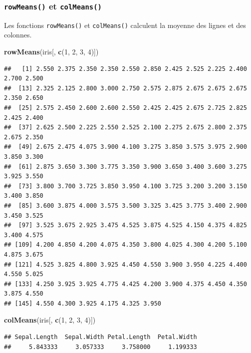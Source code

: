 \documentclass[
]{book}
\newenvironment{Shaded}{\begin{snugshade}}{\end{snugshade}}
\newcommand{\DecValTok}[1]{\textcolor[rgb]{0.00,0.00,0.81}{#1}}
\newcommand{\KeywordTok}[1]{\textcolor[rgb]{0.13,0.29,0.53}{\textbf{#1}}}
\newcommand{\NormalTok}[1]{#1}
\begin{document}
\hypertarget{l015rowmeans}{%
\subsubsection{\texorpdfstring{\texttt{rowMeans()} et \texttt{colMeans()}}{rowMeans() et colMeans()}}\label{l015rowmeans}}

Les fonctions \texttt{rowMeans()} et \texttt{colMeans()} calculent la moyenne des lignes et des colonnes.

\begin{Shaded}
\begin{Highlighting}[]
\KeywordTok{rowMeans}\NormalTok{(iris[, }\KeywordTok{c}\NormalTok{(}\DecValTok{1}\NormalTok{, }\DecValTok{2}\NormalTok{, }\DecValTok{3}\NormalTok{, }\DecValTok{4}\NormalTok{)])}
\end{Highlighting}
\end{Shaded}

\begin{verbatim}
##   [1] 2.550 2.375 2.350 2.350 2.550 2.850 2.425 2.525 2.225 2.400 2.700 2.500
##  [13] 2.325 2.125 2.800 3.000 2.750 2.575 2.875 2.675 2.675 2.675 2.350 2.650
##  [25] 2.575 2.450 2.600 2.600 2.550 2.425 2.425 2.675 2.725 2.825 2.425 2.400
##  [37] 2.625 2.500 2.225 2.550 2.525 2.100 2.275 2.675 2.800 2.375 2.675 2.350
##  [49] 2.675 2.475 4.075 3.900 4.100 3.275 3.850 3.575 3.975 2.900 3.850 3.300
##  [61] 2.875 3.650 3.300 3.775 3.350 3.900 3.650 3.400 3.600 3.275 3.925 3.550
##  [73] 3.800 3.700 3.725 3.850 3.950 4.100 3.725 3.200 3.200 3.150 3.400 3.850
##  [85] 3.600 3.875 4.000 3.575 3.500 3.325 3.425 3.775 3.400 2.900 3.450 3.525
##  [97] 3.525 3.675 2.925 3.475 4.525 3.875 4.525 4.150 4.375 4.825 3.400 4.575
## [109] 4.200 4.850 4.200 4.075 4.350 3.800 4.025 4.300 4.200 5.100 4.875 3.675
## [121] 4.525 3.825 4.800 3.925 4.450 4.550 3.900 3.950 4.225 4.400 4.550 5.025
## [133] 4.250 3.925 3.925 4.775 4.425 4.200 3.900 4.375 4.450 4.350 3.875 4.550
## [145] 4.550 4.300 3.925 4.175 4.325 3.950
\end{verbatim}

\begin{Shaded}
\begin{Highlighting}[]
\KeywordTok{colMeans}\NormalTok{(iris[, }\KeywordTok{c}\NormalTok{(}\DecValTok{1}\NormalTok{, }\DecValTok{2}\NormalTok{, }\DecValTok{3}\NormalTok{, }\DecValTok{4}\NormalTok{)])}
\end{Highlighting}
\end{Shaded}

\begin{verbatim}
## Sepal.Length  Sepal.Width Petal.Length  Petal.Width 
##     5.843333     3.057333     3.758000     1.199333
\end{verbatim}
\end{document}
